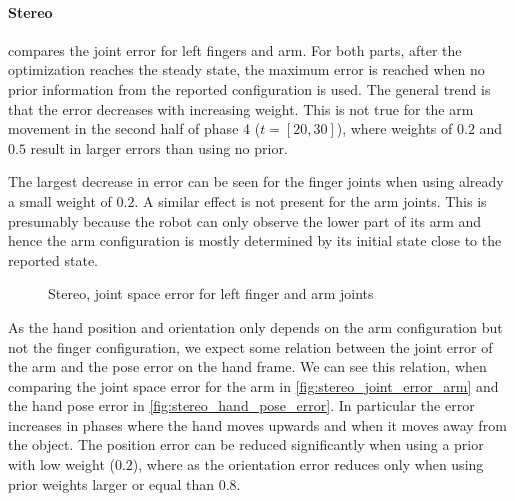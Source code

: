 \paragraph{Stereo}

 compares the joint error for left fingers and arm. For both parts, after the optimization reaches the steady state, the maximum error is reached when no prior information from the reported configuration is used.
The general trend is that the error decreases with increasing weight. This is not true for the arm movement in the second half of phase 4 ($t=[20,30]$), where weights of $0.2$ and $0.5$ result in larger errors than using no prior.

The largest decrease in error can be seen for the finger joints when using already a small weight of $0.2$. A similar effect is not present for the arm joints. This is presumably because the robot can only observe the lower part of its arm and hence the arm configuration is mostly determined by its initial state close to the reported state.


\begin{figure}
\centering
{}
%
\caption{Stereo, joint space error for left finger and arm joints}
\label{fig:stereo_joint_error}
\end{figure}

As the hand position and orientation only depends on the arm configuration but not the finger configuration, we expect some relation between the joint error of the arm and the pose error on the hand frame. We can see this relation, when comparing the joint space error for the arm in \cref{fig:stereo_joint_error_arm} and the hand pose error in \cref{fig:stereo_hand_pose_error}. In particular the error increases in phases where the hand moves upwards and when it moves away from the object. The position error can be reduced significantly when using a prior with low weight ($0.2$), where as the orientation error reduces only when using prior weights larger or equal than $0.8$.

